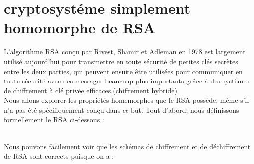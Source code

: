 \section{cryptosystéme simplement homomorphe de RSA }
L'algorithme RSA conçu par Rivest, Shamir et Adleman en 1978 est largement utilisé aujourd'hui pour transmettre en toute sécurité de petites clés secrètes entre les deux parties, qui peuvent ensuite être utilisées pour communiquer en toute sécurité  avec des messages beaucoup  plus importants grâce à des systèmes de chiffrement à clé privée efficaces.(chiffrement hybride)\\
Nous allons explorer les propriétés homomorphes que le RSA possède, même s'il n'a pas été spécifiquement conçu dans ce but. Tout d'abord, nous définissons formellement le RSA ci-dessous :\\
\\
Nous pouvons facilement voir que les schémas de chiffrement  et de déchiffrement de  RSA sont corrects puisque on a :
